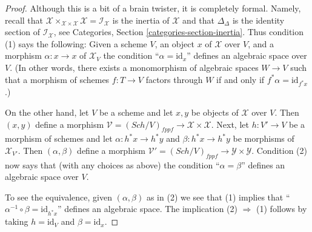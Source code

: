 \documentclass{stacks-project}
\theoremstyle{plain}
\theoremstyle{definition}
\theoremstyle{remark}
\numberwithin{equation}{subsection}
\def\Sch{\mathit{Sch}}
\begin{document}
\begin{proof}
Although this is a bit of a brain twister, it is completely formal.
Namely, recall that
$\mathcal{X} \times_{\mathcal{X} \times \mathcal{X}} \mathcal{X} =
\mathcal{I}_\mathcal{X}$ is the inertia of $\mathcal{X}$ and that
$\Delta_\Delta$ is the identity section of $\mathcal{I}_\mathcal{X}$, see
Categories, Section \ref{categories-section-inertia}.
Thus condition (1) says the following: Given a scheme $V$, an object $x$ of
$\mathcal{X}$ over $V$, and a morphism $\alpha : x \to x$ of $\mathcal{X}_V$
the condition ``$\alpha = \text{id}_x$'' defines an algebraic space over $V$.
(In other words, there exists a monomorphism of algebraic spaces $W \to V$
such that a morphism of schemes $f : T \to V$ factors through $W$
if and only if $f^*\alpha = \text{id}_{f^*x}$.)

\medskip\noindent
On the other hand, let $V$ be a scheme and let $x, y$ be objects of
$\mathcal{X}$ over $V$. Then $(x, y)$ define a morphism
$\mathcal{V} = (\Sch/V)_{fppf} \to \mathcal{X} \times \mathcal{X}$.
Next, let $h : V' \to V$ be a morphism of schemes and let
$\alpha : h^*x \to h^*y$ and $\beta : h^*x \to h^*y$ be morphisms
of $\mathcal{X}_{V'}$. Then $(\alpha, \beta)$ define a morphism
$\mathcal{V}' = (\Sch/V)_{fppf} \to \mathcal{Y} \times \mathcal{Y}$.
Condition (2) now says that (with any choices as above) the
condition ``$\alpha = \beta$'' defines an algebraic space over $V$.

\medskip\noindent
To see the equivalence, given $(\alpha, \beta)$ as in (2) we see that
(1) implies that ``$\alpha^{-1} \circ \beta = \text{id}_{h^*x}$''
defines an algebraic space. The implication (2) $\Rightarrow$ (1)
follows by taking $h = \text{id}_V$ and $\beta = \text{id}_x$.
\end{proof}
\end{document}
